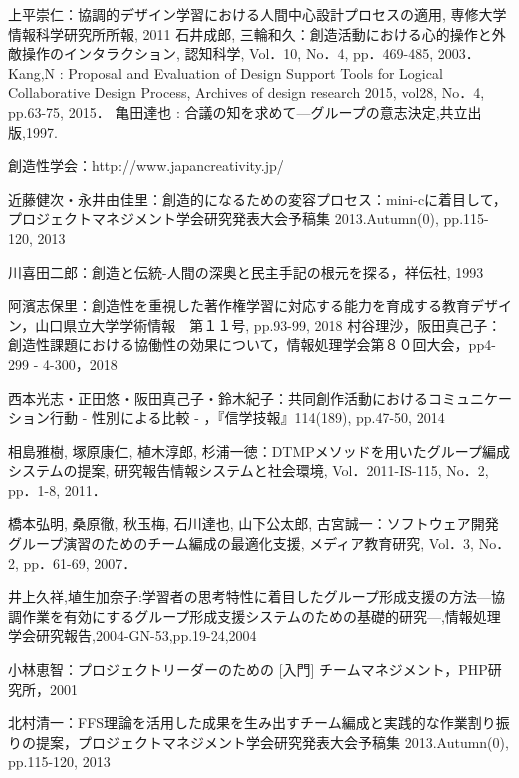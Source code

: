 \documentclass{funthesis}
\begin{document}
\begin{thebibliography}{9}
  上平崇仁：協調的デザイン学習における人間中心設計プロセスの適用, 専修大学情報科学研究所所報, 2011
石井成郎, 三輪和久：創造活動における心的操作と外敵操作のインタラクション, 認知科学, Vol．10, No．4, pp．469-485, 2003．
Kang,N : Proposal and Evaluation of Design
Support Tools for Logical Collaborative Design Process, Archives of design research 2015, vol28, No．4, pp.63-75, 2015．
亀田達也 : 合議の知を求めて—グループの意志決定,共立出版,1997.

創造性学会：http://www.japancreativity.jp/

近藤健次・永井由佳里：創造的になるための変容プロセス：mini-cに着目して，プロジェクトマネジメント学会研究発表大会予稿集 2013.Autumn(0), pp.115-120, 2013

川喜田二郎：創造と伝統-人間の深奥と民主手記の根元を探る，祥伝社, 1993

阿濱志保里：創造性を重視した著作権学習に対応する能力を育成する教育デザイン，山口県立大学学術情報　第１１号, pp.93-99, 2018
村谷理沙，阪田真己子：創造性課題における協働性の効果について，情報処理学会第８０回大会，pp4-299 - 4-300，2018

西本光志・正田悠・阪田真己子・鈴木紀子：共同創作活動におけるコミュニケーション行動 - 性別による比較 - ，『信学技報』114(189), pp.47-50, 2014

相島雅樹, 塚原康仁, 植木淳郎, 杉浦一徳：DTMPメソッドを用いたグループ編成システムの提案, 研究報告情報システムと社会環境, Vol．2011-IS-115, No．2, pp．1-8, 2011．

橋本弘明, 桑原徹, 秋玉梅, 石川達也, 山下公太郎, 古宮誠一：ソフトウェア開発グループ演習のためのチーム編成の最適化支援, メディア教育研究, Vol．3, No．2, pp．61-69, 2007． 

井上久祥,埴生加奈子:学習者の思考特性に着目したグループ形成支援の方法—協調作業を有効にするグループ形成支援システムのための基礎的研究—,情報処理学会研究報告,2004-GN-53,pp.19-24,2004

小林恵智：プロジェクトリーダーのための [入門] チームマネジメント，PHP研究所，2001

北村清一：FFS理論を活用した成果を生み出すチーム編成と実践的な作業割り振りの提案，プロジェクトマネジメント学会研究発表大会予稿集 2013.Autumn(0), pp.115-120, 2013


\end{thebibliography}
\end{document}
